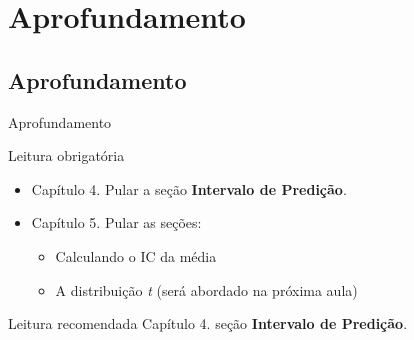 \documentclass{beamer}
\begin{document}

\section{Aprofundamento}

\subsection{Aprofundamento}

\begin{frame}{\scriptsize Aprofundamento}
  \begin{block}{Leitura obrigatória}
    \begin{itemize}
      \footnotesize
    \item Capítulo 4. Pular a seção {\bf Intervalo de Predição}.
    \item Capítulo 5. Pular as seções:
      \begin{itemize}
        \scriptsize
      \item Calculando o IC da média
      \item A distribuição {\em t} ({\tiny será abordado na próxima aula})
      \end{itemize}
    \end{itemize}
  \end{block}
  \begin{block}{Leitura recomendada}
    \scriptsize
    Capítulo 4. seção {\bf Intervalo de Predição}.
  \end{block}
\end{frame}
\end{document}
